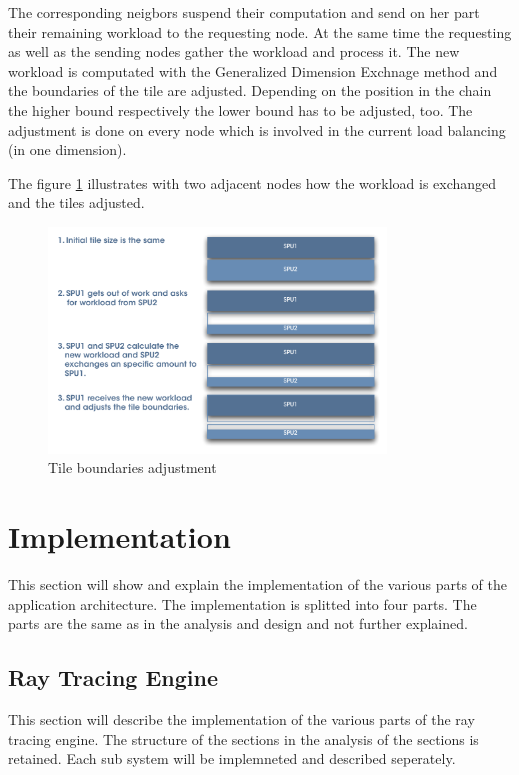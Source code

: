 \documentclass[DIV10, abstracton, openright, footsepline, headsepline, twoside, 9pt,
bigheadings]{scrreprt}
\begin{document}
The corresponding neigbors suspend their computation and send on her part their remaining
workload to the requesting node. At the same time the requesting as well as the
sending nodes gather the workload and process it. The new workload is computated with the Generalized Dimension Exchnage method and the boundaries of the tile are adjusted. Depending
on the position in the chain the higher bound respectively the lower bound has to be adjusted, too. The adjustment is done on every node which is involved
in the current load balancing (in one dimension).

The figure \ref{fig:lb_workflow} illustrates with two adjacent nodes how the workload
is exchanged and the tiles adjusted.

\begin{figure}[H]
\centering
\includegraphics[width=0.8\textwidth]{diagramme/lb_workflow}
\caption{Tile boundaries adjustment}
\label{fig:lb_workflow}
\end{figure}



\chapter{Implementation}
This section will show and explain the implementation of the various
parts of the application architecture. The implementation is splitted into
four parts. The parts are the same as in the analysis and design and not
further explained.
\section{Ray Tracing Engine}
\label{sec:impl_raytracing_engine}
This section will describe the implementation of the various parts of the
ray tracing engine. The structure of the sections in the analysis  of the
sections is retained. Each sub system will be implemneted and described
seperately.
\end{document}

